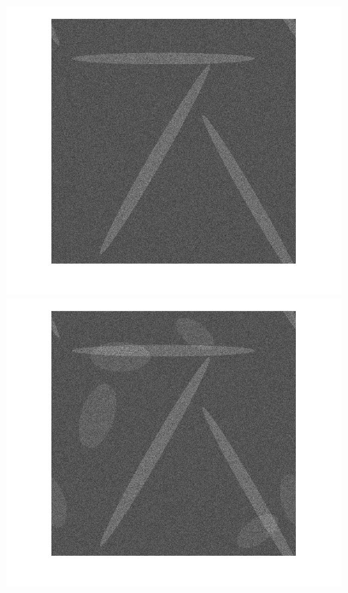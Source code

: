 \documentclass[journal]{IEEEtran}
\begin{document}
\begin{figure}[htb!]
\centering
\includegraphics[scale=.17]{../../figs/ellipses_t1}
\includegraphics[scale=.17]{../../figs/ellipses_t2}

\end{figure}
\end{document}

